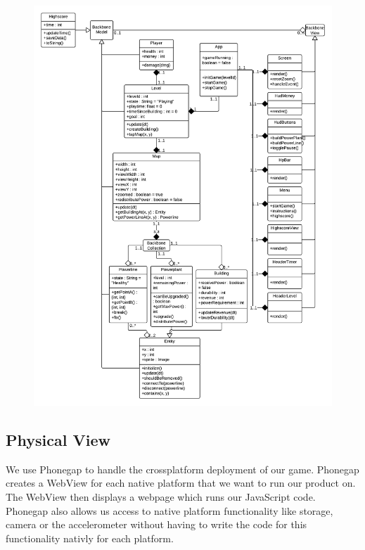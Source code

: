 	\begin{figure}[H]
	\begin{adjustwidth}{-50em}{-50em}
	\centering
	\includegraphics[scale=0.29]{pictures/class_diagram}
	\end{adjustwidth}
	\end{figure}

	\newpage

\subsection*{Physical View}

	We use Phonegap to handle the crossplatform deployment of our game. Phonegap creates a WebView for
	each native platform that we want to run our product on. The WebView then displays a webpage which
	runs our JavaScript code. Phonegap also allows us access to native platform functionality like
	storage, camera or the accelerometer without having to write the code for this functionality nativly
	for each platform.

